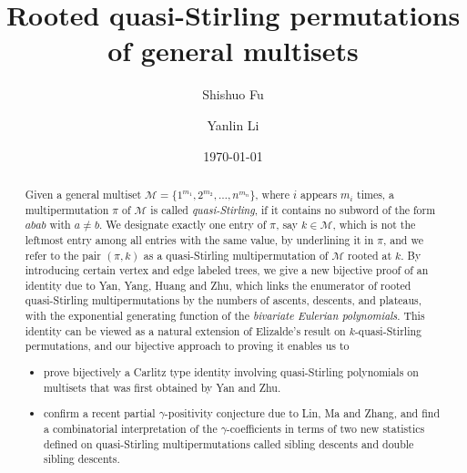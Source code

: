 \documentclass[11pt,reqno]{amsart}
\numberwithin{equation}{section}
\theoremstyle{plain}
\theoremstyle{definition}
\newcommand{\M}{\mathcal{M}}
\begin{document}
\title[Rooted quasi-Stirling permutations of general multisets]{Rooted quasi-Stirling permutations of general multisets}

\author[S. Fu]{Shishuo Fu}
\address[Shishuo Fu]{College of Mathematics and Statistics, Chongqing University, Huxi campus, Chongqing 401331, P.R. China}

\author[Y. Li]{Yanlin Li}
\address[Yanlin Li]{College of Mathematics and Statistics, Chongqing University, Huxi campus, Chongqing 401331, P.R. China}


\date{\today}


\begin{abstract}
Given a general multiset $\M=\{1^{m_1},2^{m_2},\ldots,n^{m_n}\}$, where $i$ appears $m_i$ times, a multipermutation $\pi$ of $\M$ is called {\em quasi-Stirling}, if it contains no subword of the form $abab$ with $a\neq b$. We designate exactly one entry of $\pi$, say $k\in \M$, which is not the leftmost entry among all entries with the same value, by underlining it in $\pi$, and we refer to the pair $(\pi,k)$ as a quasi-Stirling multipermutation of $\M$ rooted at $k$. By introducing certain vertex and edge labeled trees, we give a new bijective proof of an identity due to Yan, Yang, Huang and Zhu, which links the enumerator of rooted quasi-Stirling multipermutations by the numbers of ascents, descents, and plateaus, with the exponential generating function of the {\em bivariate Eulerian polynomials}. This identity can be viewed as a natural extension of Elizalde's result on $k$-quasi-Stirling permutations, and our bijective approach to proving it enables us to
\begin{itemize}
	\item prove bijectively a Carlitz type identity involving quasi-Stirling polynomials on multisets that was first obtained by Yan and Zhu.
	\item confirm a recent partial $\gamma$-positivity conjecture due to Lin, Ma and Zhang, and find a combinatorial interpretation of the $\gamma$-coefficients in terms of two new statistics defined on quasi-Stirling multipermutations called sibling descents and double sibling descents.
\end{itemize}
\end{abstract}



\keywords{}

\maketitle
\end{document}
